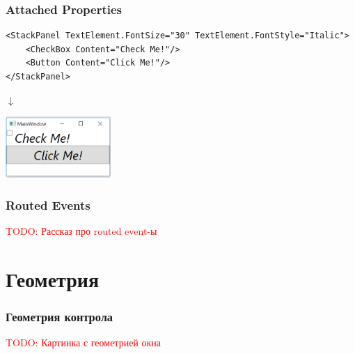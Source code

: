 \documentclass[xetex,mathserif,serif]{beamer}
\newcommand{\todo}[1] {
	\begin{center}\textcolor{red}{TODO: #1}\end{center}
}
\begin{document}
	\begin{frame}[fragile]
		\frametitle{Attached Properties}
		\begin{small}
			\begin{verbatim}
<StackPanel TextElement.FontSize="30" TextElement.FontStyle="Italic">
    <CheckBox Content="Check Me!"/>
    <Button Content="Click Me!"/>
</StackPanel>
			\end{verbatim}
		\end{small}
		\begin{center}\begin{LARGE}$\downarrow$\end{LARGE}\end{center}
		\begin{center}
			\includegraphics[width=0.3\textwidth]{fancyWindow.png}
		\end{center}
	\end{frame}

	\begin{frame}
		\frametitle{Routed Events}
		\todo{Рассказ про routed event-ы}
	\end{frame}

	\section{Геометрия}

	\begin{frame}
		\frametitle{Геометрия контрола}
		\todo{Картинка с геометрией окна}
	\end{frame}
\end{document}
